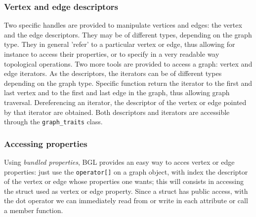 \documentclass[11pt]{article} %
\newcommand{\classname}[1]{\texttt{#1}}
\begin{document}
		\subsubsection{Vertex and edge descriptors}
		Two specific handles are provided to manipulate vertices and edges: the vertex and the edge descriptors. They may be of different types, depending on the graph type. They in general 'refer' to a particular vertex or edge, thus allowing for instance to access their properties, or to specify in a very readable way topological operations. \newline
		Two more tools are provided to access a graph: vertex and edge iterators. As the descriptors, the iterators can be of different types depending on the graph type. Specific function return the iterator to the first and last vertex and to the first and last edge in the graph, thus allowing graph traversal. Dereferencing an iterator, the descriptor of the vertex or edge pointed by that iterator are obtained. \newline
		Both descriptors and iterators are accessible through the \classname{graph\_traits} class.
		
		\subsubsection{Accessing properties}
		Using \textit{bundled properties}, BGL provides an easy way to acces vertex or edge properties: just use the \texttt{operator[]} on a graph object, with index the descriptor of the vertex or edge whose properties one wants; this will consists in accessing the struct used as vertex or edge property. Since a struct has public access, with the dot operator we can immediately read from or write in each attribute or call a member function.
		
	
	
\end{document}
